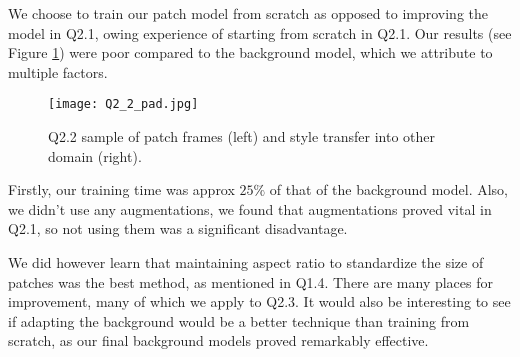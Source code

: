 We choose to train our patch model from scratch as opposed to improving the model in Q2.1, owing experience of starting from scratch in Q2.1.
Our results (see Figure \ref{fig:Q2_2}) were poor compared to the background model, which we attribute to multiple factors.
\begin{figure}[h!]
  \begin{center}
  \texttt{[image: Q2\_2\_pad.jpg]}
    \caption{Q2.2 sample of patch frames (left) and style transfer into other domain (right).}
    \label{fig:Q2_2}
  \end{center}
  \end{figure}

Firstly, our training time was approx $25\%$ of that of the background model.
Also, we didn't use any augmentations, we found that augmentations proved vital in Q2.1, so not using them was a significant disadvantage.

We did however learn that maintaining aspect ratio to standardize the size of patches was the best method, as mentioned in Q1.4.
There are many places for improvement, many of which we apply to Q2.3.
It would also be interesting to see if adapting the background would be a better technique than training from scratch, as our final background models proved remarkably effective.
